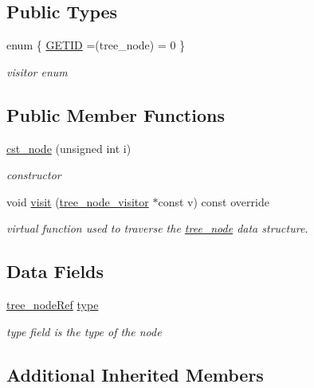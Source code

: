 \subsection*{Public Types}
\begin{DoxyCompactItemize}
\item 
enum \{ \hyperlink{structcst__node_af089f8f7c8f9a43e50fa5f274f22598da568b4042a46a8dc7f682e1e090efe1a7}{G\+E\+T\+ID} =(tree\+\_\+node) = 0
 \}\begin{DoxyCompactList}\small\item\em visitor enum \end{DoxyCompactList}
\end{DoxyCompactItemize}
\subsection*{Public Member Functions}
\begin{DoxyCompactItemize}
\item 
\hyperlink{structcst__node_a034c48a5307b1177a1c3c9f1c7bf80af}{cst\+\_\+node} (unsigned int i)
\begin{DoxyCompactList}\small\item\em constructor \end{DoxyCompactList}\item 
void \hyperlink{structcst__node_a64e2bc20ffda1b13ffe894cacb982f89}{visit} (\hyperlink{classtree__node__visitor}{tree\+\_\+node\+\_\+visitor} $\ast$const v) const override
\begin{DoxyCompactList}\small\item\em virtual function used to traverse the \hyperlink{classtree__node}{tree\+\_\+node} data structure. \end{DoxyCompactList}\end{DoxyCompactItemize}
\subsection*{Data Fields}
\begin{DoxyCompactItemize}
\item 
\hyperlink{tree__node_8hpp_a6ee377554d1c4871ad66a337eaa67fd5}{tree\+\_\+node\+Ref} \hyperlink{structcst__node_ac02ea10294f1e110ce5205de56bed8bd}{type}
\begin{DoxyCompactList}\small\item\em type field is the type of the node \end{DoxyCompactList}\end{DoxyCompactItemize}
\subsection*{Additional Inherited Members}


